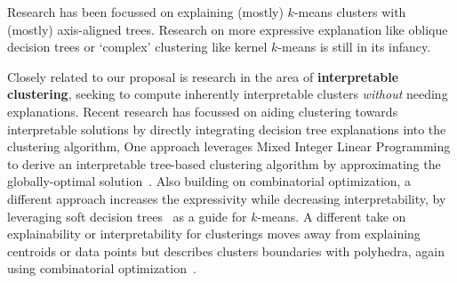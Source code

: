 \documentclass[a4paper,11pt]{article}
\begin{document}
Research has been focussed on explaining (mostly) $k$-means clusters with (mostly) axis-aligned trees. 
Research on more expressive explanation like oblique decision trees or `complex' clustering like kernel $k$-means is still in its infancy.

Closely related to our proposal is research in the area of \textbf{interpretable clustering},
seeking to compute inherently interpretable clusters \emph{without} needing \posthoc explanations.
Recent research has focussed on aiding clustering towards interpretable solutions by directly integrating decision tree explanations into the clustering algorithm,
One approach leverages Mixed Integer Linear Programming to derive an interpretable tree-based clustering algorithm by approximating the globally-optimal solution~\cite{bertsimas2021interpretable}. 
Also building on combinatorial optimization, a different approach increases the expressivity while decreasing interpretability, by leveraging soft decision trees~\cite{cohen2023interpretable} as a guide for $k$-means. 
A different take on explainability or interpretability for clusterings moves away from explaining centroids or data points but describes clusters boundaries with polyhedra, again using combinatorial optimization~\cite{lawless2023polyhedral}. 


\end{document}
